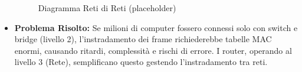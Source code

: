 \documentclass{article}
\begin{document}
\begin{itemize}
\begin{figure}[H]
        \caption{Diagramma Reti di Reti (placeholder)}
    \end{figure}
    \item \textbf{Problema Risolto:} Se milioni di computer fossero connessi solo con switch e bridge (livello 2), l'instradamento dei frame richiederebbe tabelle MAC enormi, causando ritardi, complessità e rischi di errore. I router, operando al livello 3 (Rete), semplificano questo gestendo l'instradamento tra reti.
\end{itemize}
\end{document}
